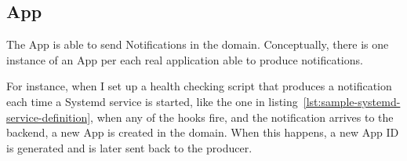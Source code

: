 \subsection{App}\label{sec:app}

The App is able to send Notifications
in the domain.
Conceptually,
there is one instance of an App
per each real application
able to produce notifications.

For instance,
when I set up a health checking script
that produces a notification each time
a Systemd service is started,
like the one in listing~\ref{lst:sample-systemd-service-definition},
when any of the hooks fire,
and the notification arrives to the backend,
a new App is created in the domain.
When this happens,
a new App ID is generated
and is later sent back to the producer.
